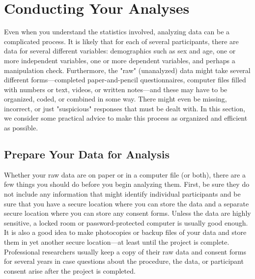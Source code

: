 \section{Conducting Your Analyses}
  
    
Even when you understand the statistics involved, analyzing data can be a complicated process. It is likely that for each of several participants, there are data for several different variables: demographics such as sex and age, one or more independent variables, one or more dependent variables, and perhaps a manipulation check. Furthermore, the "raw" (unanalyzed) data might take several different forms---completed paper-and-pencil questionnaires, computer files filled with numbers or text, videos, or written notes---and these may have to be organized, coded, or combined in some way. There might even be missing, incorrect, or just "suspicious" responses that must be dealt with. In this section, we consider some practical advice to make this process as organized and efficient as possible.


\subsection{Prepare Your Data for Analysis}

Whether your raw data are on paper or in a computer file (or both), there are a few things you should do before you begin analyzing them. First, be sure they do not include any information that might identify individual participants and be sure that you have a secure location where you can store the data and a separate secure location where you can store any consent forms. Unless the data are highly sensitive, a locked room or password-protected computer is usually good enough. It is also a good idea to make photocopies or backup files of your data and store them in yet another secure location---at least until the project is complete. Professional researchers usually keep a copy of their raw data and consent forms for several years in case questions about the procedure, the data, or participant consent arise after the project is completed.

